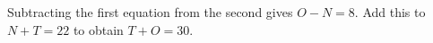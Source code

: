 Subtracting the first equation from the second gives $O-N=8$. Add this to $N+T=22$ to obtain $\boxed{T+O=30}$.
